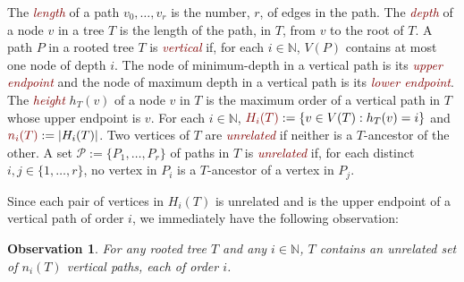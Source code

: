 \documentclass[lotsofwhite]{patmorin}
\newcommand{\defn}[1]{\textcolor{Maroon}{\emph{#1}}}
\newcommand{\mathdefn}[1]{\textcolor{Maroon}{#1}}
\newcommand{\N}{\mathbb{N}}
\DeclarePairedDelimiter{\floor}{\lfloor}{\rfloor}
\newcommand{\PP}{\mathcal{P}}
\theoremstyle{plain}
\newtheorem{obs}[thm]{Observation}
\theoremstyle{definition}
\begin{document}

The \defn{length} of a path $v_0,\ldots,v_r$ is the number, $r$, of edges in the path. The \defn{depth} of a node $v$ in a tree $T$ is the length of the path, in $T$, from $v$ to the root of $T$. A path $P$ in a rooted tree $T$ is \defn{vertical} if, for each $i\in\N$, $V(P)$ contains at most one node of depth $i$. The node of minimum-depth in a vertical path is its \defn{upper endpoint} and the node of maximum depth in a vertical path is its \defn{lower endpoint}.  The \defn{height} $h_T(v)$ of a node $v$ in $T$ is the maximum order of a vertical path in $T$ whose upper endpoint is $v$.  For each $i\in\N$, $\mathdefn{H_i(T)}:=\{v\in V(T):h_T(v)=i\}$ and $\mathdefn{n_i(T)}:=|H_i(T)|$.  Two vertices of $T$ are \defn{unrelated} if neither is a $T$-ancestor of the other.  A set $\mathcal{P}:=\{P_1,\ldots,P_r\}$ of paths in $T$ is \defn{unrelated} if, for each distinct $i,j\in\{1,\ldots,r\}$, no vertex in $P_i$ is a $T$-ancestor of a vertex in $P_j$.

Since each pair of vertices in $H_i(T)$ is unrelated and is the upper endpoint of a vertical path of order $i$, we immediately have the following observation:

\begin{obs}\label{same_height_unrelated}
  For any rooted tree $T$ and any $i\in\N$, $T$ contains an unrelated set of $n_i(T)$ vertical paths, each of order $i$.
\end{obs}
\end{document}
